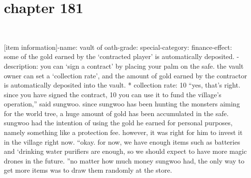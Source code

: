 \section{chapter 181}

                             




[item information]-name: vault of oath-grade: special-category: finance-effect: some of the gold earned by the ‘contracted player’ is automatically deposited.
-description: you can ‘sign a contract’ by placing your palm on the safe.
 the vault owner can set a ‘collection rate’, and the amount of gold earned by the contractor is automatically deposited into the vault.
* collection rate: 10%
“yes, that’s right.
 since you have signed the contract, 10%
 you can use it to fund the village’s operation,” said sungwoo.
since sungwoo has been hunting the monsters aiming for the world tree, a huge amount of gold has been accumulated in the safe.
sungwoo had the intention of using the gold he earned for personal purposes, namely something like a protection fee.
 however, it was right for him to invest it in the village right now.
“okay.
 for now, we have enough items such as batteries and ‘drinking water purifiers are enough, so we should expect to have more magic drones in the future.
”no matter how much money sungwoo had, the only way to get more items was to draw them randomly at the store.

